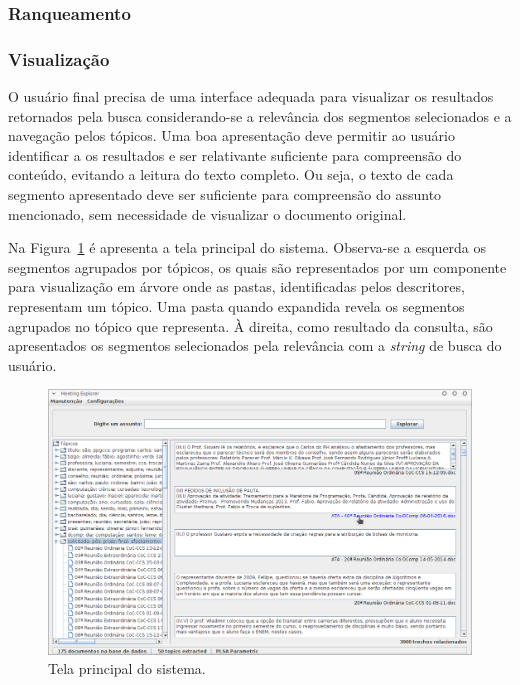 \subsubsection{Ranqueamento}

\subsubsection{Visualização}

O usuário final precisa de uma interface adequada para visualizar os resultados retornados pela busca considerando-se a relevância dos segmentos selecionados e a navegação pelos tópicos. Uma boa apresentação deve permitir ao usuário identificar a os resultados e ser relativante suficiente para compreensão do conteúdo, evitando a leitura do texto completo. Ou seja, o texto de cada segmento apresentado deve ser suficiente para compreensão do assunto mencionado, sem necessidade de visualizar o documento original.



Na Figura~\ref{fig:tela-principal} é apresenta a tela principal do sistema. Observa-se a esquerda os segmentos agrupados por tópicos, os quais são representados por um componente para visualização em árvore onde as pastas, identificadas pelos descritores, representam um tópico. Uma pasta quando expandida revela os segmentos agrupados no tópico que representa. À direita, como resultado da consulta, são apresentados os segmentos selecionados pela relevância com a \textit{string} de busca do usuário. 

  \begin{figure}[!h]
	  \centering
	  \includegraphics[width=\textwidth]{conteudo/capitulos/figs/tela-principal-2-1.png}
	  \caption{Tela principal do sistema.}
	  \label{fig:tela-principal}
  \end{figure}





